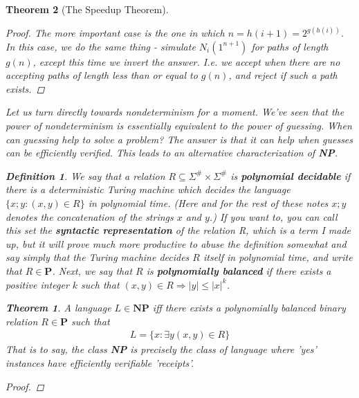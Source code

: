\documentclass{article}
\theoremstyle{definition}
\newtheorem{definition}{Definition}[section]
\theoremstyle{plain}
\theoremstyle{theorem}
\newtheorem{theorem}{Theorem}[section]
\begin{document}
\begin{theorem}[The Speedup Theorem]
\begin{proof}
	\par The more important case is the one in which $n = h(i+1) = 2^{g(h(i))}$. In this case, we do the same thing - simulate $N_i(1^{n+1})$ for paths of length $g(n)$, except this time we invert the answer. I.e. we accept when there are no accepting paths of length less than or equal to $g(n)$, and reject if such a path exists. 
\end{proof}
\par Let us turn directly towards nondeterminism for a moment. We've seen that the power of nondeterminism is essentially equivalent to the power of guessing. When can guessing help to solve a problem? The answer is that it can help when guesses can be efficiently verified. This leads to an alternative characterization of \textbf{NP}. 
\begin{definition}
    We say that a relation $R \subseteq \Sigma^{\#} \times \Sigma^{\#}$ is \textbf{polynomial decidable} if there is a deterministic Turing machine which decides the language $\{x;y: (x,y) \in R\}$ in polynomial time. (Here and for the rest of these notes $x;y$ denotes the concatenation of the strings $x$ and $y$.) If you want to, you can call this set the \textbf{syntactic representation} of the relation R, which is a term I made up, but it will prove much more productive to abuse the definition somewhat and say simply that the Turing machine decides $R$ itself in polynomial time, and write that $R \in \textbf{P}$. Next, we say that $R$ is \textbf{polynomially balanced} if there exists a positive integer $k$ such that $(x,y) \in R \Rightarrow |y| \leq |x|^k$.
\end{definition}
\begin{theorem} 
    A language $L \in \textbf{NP}$ iff there exists a polynomially balanced binary relation $R \in \textbf{P}$ such that 
    \begin{align}
        L = \{x: \exists y (x,y) \in R \}
    \end{align}
    That is to say, the class \textbf{NP} is precisely the class of language where 'yes' instances have efficiently verifiable 'receipts'.
\end{theorem}
\begin{proof}

\end{proof}
\end{theorem}
\end{document}
